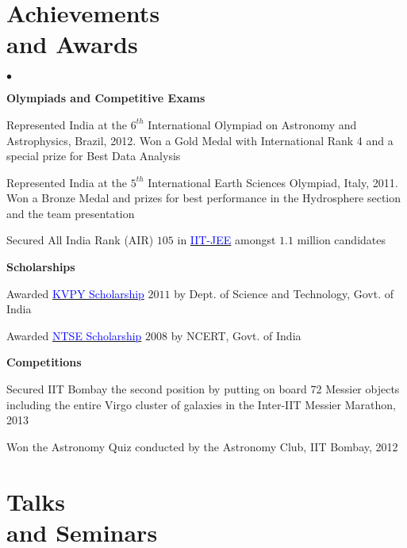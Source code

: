 \documentclass[margin,line]{res}
\newenvironment{list2}{
  \begin{list}{$\bullet$}{%
      \setlength{\itemsep}{0in}
      \setlength{\parsep}{0in} \setlength{\parskip}{0in}
      \setlength{\topsep}{0in} \setlength{\partopsep}{0in} 
      \setlength{\leftmargin}{0.2in}}}{\end{list}}
\begin{document}
\begin{resume}
\section{\sc Achievements \\and Awards}
\begin{list2}
\item[\strut\hspace{0.5cm}\textbf{Olympiads and Competitive Exams}]
\item Represented India at the $6^{th}$ International Olympiad on Astronomy and Astrophysics, Brazil, 2012. Won a Gold Medal with International Rank 4 and a special prize for Best Data Analysis
\item Represented India at the $5^{th}$ International Earth Sciences Olympiad, Italy, 2011. Won a Bronze Medal and prizes for best performance in the Hydrosphere section and the team presentation
\item  Secured All India Rank (AIR) $105$ in \href{https://en.wikipedia.org/wiki/Indian_Institute_of_Technology_Joint_Entrance_Examination}{\textcolor{blue}{IIT-JEE}} amongst $1.1$ million candidates
\vspace{0.05in}
\item[\strut\hspace{0.5cm}\textbf{Scholarships}]
\item Awarded \href{http://www.kvpy.iisc.ernet.in/main/index.htm}{\textcolor{blue}{KVPY Scholarship}} $2011$ by Dept. of Science and Technology, Govt. of India
\item Awarded \href{http://www.ncert.nic.in/programmes/talent_exam/index_talent.html}{\textcolor{blue}{NTSE Scholarship}} $2008$ by NCERT, Govt. of India
\item[\strut\hspace{0.5cm}\textbf{Competitions}]
\item Secured IIT Bombay the second position by putting on board 72 Messier objects including the entire Virgo cluster of galaxies in the Inter-IIT Messier Marathon, 2013
\item Won the Astronomy Quiz conducted by the Astronomy Club, IIT Bombay, 2012
\end{list2}

\section{\sc Talks \\and Seminars}


\end{resume}
\end{document}
